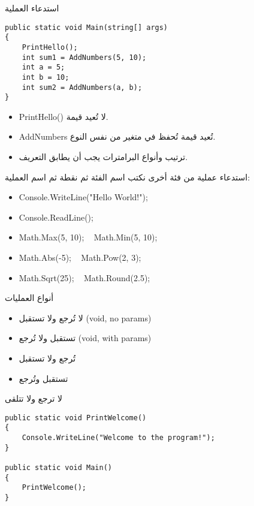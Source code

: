 \documentclass[13pt]{beamer}
\begin{document}
\begin{frame}[fragile]{استدعاء العملية}
\begin{english}
\begin{lstlisting}[language=CSharp]
public static void Main(string[] args)
{
    PrintHello();
    int sum1 = AddNumbers(5, 10);
    int a = 5;
    int b = 10;
    int sum2 = AddNumbers(a, b);
}
\end{lstlisting}
\end{english}
\vspace{0.5em}
\begin{itemize}
  \item \textenglish{PrintHello()} لا تُعيد قيمة.
  \item \textenglish{AddNumbers} تُعيد قيمة تُحفظ في متغير من نفس النوع.
  \item ترتيب وأنواع البرامترات يجب أن يطابق التعريف.
\end{itemize}
\end{frame}

\begin{frame}[fragile]{استدعاء عملية من فئة أخرى}
نكتب اسم الفئة ثم نقطة ثم اسم العملية:

\begin{english}
\begin{itemize}
  \item Console.WriteLine("Hello World!");
  \item Console.ReadLine();
  \item Math.Max(5, 10); ~ Math.Min(5, 10);
  \item Math.Abs(-5); ~ Math.Pow(2, 3);
  \item Math.Sqrt(25); ~ Math.Round(2.5);
\end{itemize}
\end{english}
\end{frame}

\begin{frame}[fragile]{أنواع العمليات}
\begin{itemize}
  \item لا تُرجع ولا تستقبل \textenglish{(void, no params)}
  \item تستقبل ولا تُرجع \textenglish{(void, with params)}
  \item تُرجع ولا تستقبل
  \item تستقبل وتُرجع
\end{itemize}
\end{frame}

\begin{frame}[fragile]{لا ترجع ولا تتلقى}
\begin{english}
\begin{lstlisting}[language=CSharp]
public static void PrintWelcome()
{
    Console.WriteLine("Welcome to the program!");
}

public static void Main()
{
    PrintWelcome();
}
\end{lstlisting}
\end{english}
\end{frame}
\end{document}
